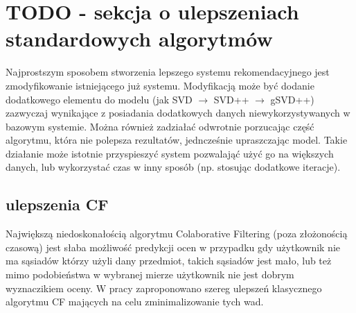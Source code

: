 \documentclass{pracamgr}
\begin{document}
  \section{TODO - sekcja o ulepszeniach standardowych algorytmów}
   Najprostszym sposobem stworzenia lepszego systemu rekomendacyjnego jest zmodyfikowanie istniejącego już systemu.\newline
   Modyfikacją może być dodanie dodatkowego elementu do modelu (jak SVD $\rightarrow$ SVD++ $\rightarrow$ gSVD++)
   zazwyczaj wynikające z posiadania dodatkowych danych niewykorzystywanych w bazowym systemie.
   Można również zadziałać odwrotnie porzucając część algorytmu, która nie polepsza rezultatów, jedncześnie upraszczając model.
   Takie działanie może istotnie przyspieszyć system pozwalająć użyć go na większych danych, lub wykorzystać czas w inny sposób
   (np. stosując dodatkowe iteracje).
   \subsection{ulepszenia CF}
    Największą niedoskonałością algorytmu Colaborative Filtering (poza złożonością czasową) jest słaba możliwość predykcji ocen w przypadku gdy użytkownik nie
    ma sąsiadów którzy użyli dany przedmiot, takich sąsiadów jest mało,
    lub też mimo podobieństwa w wybranej mierze użytkownik nie jest dobrym wyznaczikiem oceny.\newline
    W pracy \cite{221} zaproponowano szereg ulepszeń klasycznego algorytmu CF mających na celu zminimalizowanie tych wad.
\end{document}
